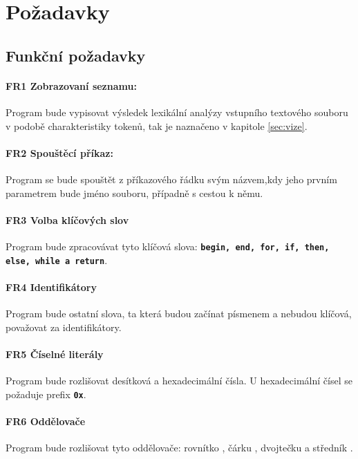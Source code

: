 \section {Požadavky}

\subsection {Funkční požadavky} 

\paragraph {FR1 Zobrazovaní seznamu:} Program bude vypisovat výsledek lexikální analýzy vstupního textového souboru v podobě charakteristiky tokenů, tak je naznačeno v kapitole \ref{sec:vize}.

\paragraph {FR2 Spouštěcí příkaz:} Program se bude spouštět z příkazového řádku svým názvem,kdy jeho prvním parametrem bude  jméno souboru, případně s cestou k němu.

\paragraph {FR3 Volba klíčových slov} Program bude zpracovávat tyto klíčová slova: \textbf{\texttt{begin, end, for, if, then, else, while a return}}.

\paragraph {FR4 Identifikátory} Program bude ostatní slova, ta která budou začínat písmenem a nebudou klíčová, považovat za identifikátory.

\paragraph {FR5 Číselné literály} Program bude rozlišovat desítková a hexadecimální čísla. U hexadecimální  čísel se požaduje prefix \textbf{\lstinline|0x|}.

\paragraph {FR6 Oddělovače} Program bude rozlišovat tyto oddělovače: rovnítko \uv{\textbf{=}}, čárku \uv{\textbf{,}}, dvojtečku \uv{\textbf{:}}  a středník \uv{\textbf{;}}.

